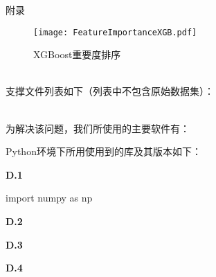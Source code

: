 \documentclass{MathorCupModeling}
\begin{document}

	\begin{center}
		\heiti{} 附\hspace{2pc}录
	\end{center}

	\begin{figure}[H]
		\centering
		\texttt{[image: FeatureImportanceXGB.pdf]}
		\caption{XGBoost重要度排序}
		\label{fig:XGBoost排序}
	\end{figure}
\newpage
	~\\

	支撑文件列表如下（列表中不包含原始数据集）：

\newpage
	~\\

	为解决该问题，我们所使用的主要软件有：
	
	Python环境下所用使用到的库及其版本如下：

\newpage

\textbf{D.1 }
\begin{python}
import numpy as np
\end{python}
\newpage
\textbf{D.2 }

\newpage
\textbf{D.3 }

\newpage
\textbf{D.4 }
\end{document}
